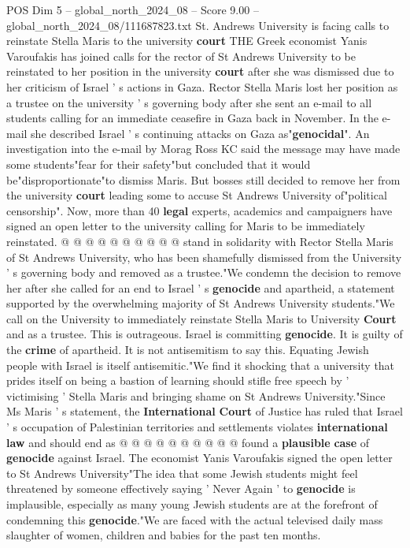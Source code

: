 \begin{textsample}{POS Dim 5 – global\_north\_2024\_08 – Score 9.00 – global\_north\_2024\_08/111687823.txt}  \label{ex:f5_pos_399}
St.
Andrews University is facing calls to reinstate Stella Maris to the university \textbf{court} THE Greek economist Yanis Varoufakis has joined calls for the rector of St Andrews University to be reinstated to her position in the university \textbf{court} after she was dismissed due to her criticism of Israel ' s actions in Gaza.
Rector Stella Maris lost her position as a trustee on the university ' s governing body after she sent an e-mail to all students calling for an immediate ceasefire in Gaza back in November.
In the e-mail she described Israel ' s continuing attacks on Gaza as"\textbf{genocidal}".
An investigation into the e-mail by Morag Ross KC said the message may have made some students"fear for their safety"but concluded that it would be"disproportionate"to dismiss Maris.
But bosses still decided to remove her from the university \textbf{court} leading some to accuse St Andrews University of"political censorship".
Now, more than 40 \textbf{legal} experts, academics and campaigners have signed an open letter to the university calling for Maris to be immediately reinstated. @ @ @ @ @ @ @ @ @ @ stand in solidarity with Rector Stella Maris of St Andrews University, who has been shamefully dismissed from the University ' s governing body and removed as a trustee."We condemn the decision to remove her after she called for an end to Israel ' s \textbf{genocide} and apartheid, a statement supported by the overwhelming majority of St Andrews University students."We call on the University to immediately reinstate Stella Maris to University \textbf{Court} and as a trustee.
This is outrageous.
Israel is committing \textbf{genocide}.
It is guilty of the \textbf{crime} of apartheid.
It is not antisemitism to say this.
Equating Jewish people with Israel is itself antisemitic."We find it shocking that a university that prides itself on being a bastion of learning should stifle free speech by ' victimising ' Stella Maris and bringing shame on St Andrews University."Since Ms Maris ' s statement, the \textbf{International} \textbf{Court} of Justice has ruled that Israel ' s occupation of Palestinian territories and settlements violates \textbf{international} \textbf{law} and should end as @ @ @ @ @ @ @ @ @ @ found a \textbf{plausible} \textbf{case} of \textbf{genocide} against Israel.
The economist Yanis Varoufakis signed the open letter to St Andrews University"The idea that some Jewish students might feel threatened by someone effectively saying ' Never Again ' to \textbf{genocide} is implausible, especially as many young Jewish students are at the forefront of condemning this \textbf{genocide}."We are faced with the actual televised daily mass slaughter of women, children and babies for the past ten months.

\end{textsample}
